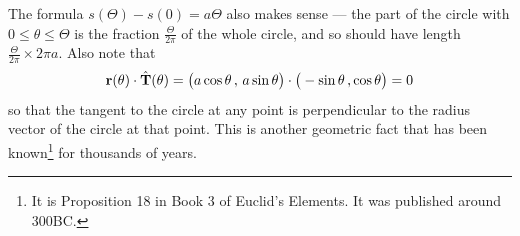 \begin{eg}
{\begin{efig}
\begin{center}
\end{center}
\end{efig}
}
The formula $s(\Theta)-s(0)=a\Theta$ also makes sense --- the part of the 
circle with $0\le\theta\le\Theta$ is the fraction $\frac{\Theta}{2\pi}$
of the whole circle, and so should have length $\frac{\Theta}{2\pi}\times
2\pi a$. Also note that
\begin{equation*}
\mathbf{r}(\theta)\cdot\hat{\mathbf{T}}(\theta) = \big(a\cos\theta\,,\,a\sin\theta\big)
\cdot \big(-\sin\theta\,,\cos\theta\big)
=0
\end{equation*}
so that the tangent to the circle at any point is perpendicular
to the radius vector of the circle at that point. This is another geometric fact 
that has been known\footnote{It is Proposition 18 in Book 3 of Euclid's Elements. It was published around 300BC.} for thousands of years.
\end{eg}



